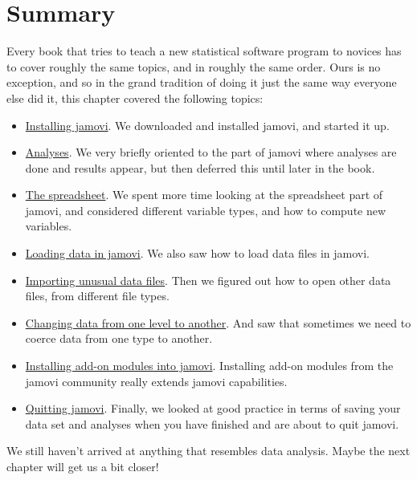 \documentclass[
  a4paper,
]{book}
\providecommand{\tightlist}{%
  \setlength{\itemsep}{0pt}\setlength{\parskip}{0pt}}\usepackage{longtable,booktabs,array}
\begin{document}
\hypertarget{summary-1}{%
\section{Summary}\label{summary-1}}

Every book that tries to teach a new statistical software program to
novices has to cover roughly the same topics, and in roughly the same
order. Ours is no exception, and so in the grand tradition of doing it
just the same way everyone else did it, this chapter covered the
following topics:

\begin{itemize}
\tightlist
\item
  \protect\hyperlink{installing-jamovi}{Installing jamovi}. We
  downloaded and installed jamovi, and started it up.
\item
  \protect\hyperlink{analyses}{Analyses}. We very briefly oriented to
  the part of jamovi where analyses are done and results appear, but
  then deferred this until later in the book.
\item
  \protect\hyperlink{the-spreadsheet}{The spreadsheet}. We spent more
  time looking at the spreadsheet part of jamovi, and considered
  different variable types, and how to compute new variables.
\item
  \protect\hyperlink{loading-data-in-jamovi}{Loading data in jamovi}. We
  also saw how to load data files in jamovi.
\item
  \protect\hyperlink{importing-unusual-data-files}{Importing unusual
  data files}. Then we figured out how to open other data files, from
  different file types.
\item
  \protect\hyperlink{sec-Changing-data-from-one-level-to-another}{Changing
  data from one level to another}. And saw that sometimes we need to
  coerce data from one type to another.
\item
  \protect\hyperlink{installing-add-on-modules-into-jamovi}{Installing
  add-on modules into jamovi}. Installing add-on modules from the jamovi
  community really extends jamovi capabilities.
\item
  \protect\hyperlink{quitting-jamovi}{Quitting jamovi}. Finally, we
  looked at good practice in terms of saving your data set and analyses
  when you have finished and are about to quit jamovi.
\end{itemize}

We still haven't arrived at anything that resembles data analysis. Maybe
the next chapter will get us a bit closer!
\end{document}

